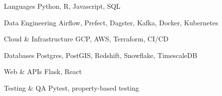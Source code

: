 

\begin{cvhonors}

  \cvhonor
    {Languages} %
    {Python, R, Javascript, SQL} %
    {} %
    {} %

  \cvhonor
    {Data Engineering} %
    {Airflow, Prefect, Dagster, Kafka, Docker, Kubernetes} %
    {} %
    {} %

  \cvhonor
    {Cloud \& Infrastructure} %
    {GCP, AWS, Terraform, CI/CD} %
    {} %
    {} %

  \cvhonor
    {Databases} %
    {Postgres, PostGIS, Redshift, Snowflake, TimescaleDB} %
    {} %
    {} %

  \cvhonor
    {Web \& APIs} %
    {Flask, React} %
    {} %
    {} %

  \cvhonor
    {Testing \& QA} %
    {Pytest, property-based testing} %
    {} %
    {} %

\end{cvhonors}
